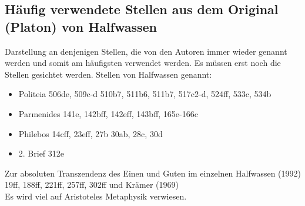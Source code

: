 \documentclass[12pt]{article}
\begin{document}
\subsection{Häufig verwendete Stellen aus dem Original (Platon) von Halfwassen}
Darstellung an denjenigen Stellen, die von den Autoren immer wieder genannt werden und somit am häufigsten verwendet werden. Es müssen erst noch die Stellen gesichtet werden. Stellen von Halfwassen genannt:
\begin{itemize}
    \item {Politeia 506de, 509c-d 510b7, 511b6, 511b7, 517c2-d, 524ff, 533c, 534b}
    \item {Parmenides 141e, 142bff, 142eff, 143bff, 165e-166c}
    \item {Philebos 14cff, 23eff, 27b 30ab, 28c, 30d}
    \item {2. Brief 312e}
\end{itemize}

Zur absoluten Transzendenz des Einen und Guten im einzelnen Halfwassen (1992) 19ff, 188ff, 221ff, 257ff, 302ff und Krämer (1969)\\
Es wird viel auf Aristoteles Metaphysik verwiesen.
\end{document}

